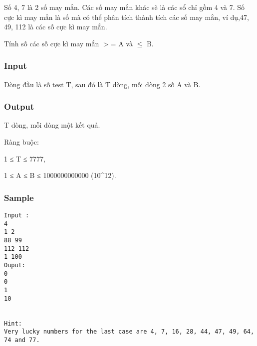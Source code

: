 



   Số 4, 7 là 2 số may mắn. Các số may mắn khác sẽ là các sổ chỉ gồm 4 và 7.  Số cực kì may mắn là số mà có thể phân tích thành tích các số may mắn,  ví dụ,47, 49, 112 là các số cực kì may mắn.  

   Tính số các số cực kì may mắn $>$= A và  $\le$ B.  



\subsubsection{   Input  }



   Dòng đầu là số test T, sau đó là T dòng, mỗi dòng 2 số A và B.  



\subsubsection{   Output  }



   T dòng, mỗi dòng một kết quả.  

   Ràng buộc:  

   1 ≤ T ≤ 7777,  

   1 ≤ A ≤ B ≤ 1000000000000 (10^12).  



\subsubsection{   Sample  }
\begin{verbatim}
Input :
4 
1 2 
88 99 
112 112 
1 100 
Ouput: 
0 
0 
1 
10 

 
Hint: 
Very lucky numbers for the last case are 4, 7, 16, 28, 44, 47, 49, 64, 74 and 77. 
\end{verbatim}
